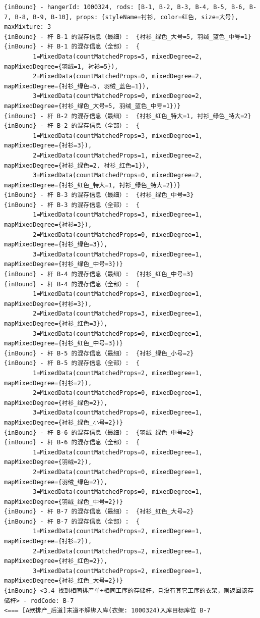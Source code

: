 {\begin{verbatim}
{inBound} - hangerId: 1000324, rods: [B-1, B-2, B-3, B-4, B-5, B-6, B-7, B-8, B-9, B-10], props: {styleName=衬衫, color=红色, size=大号}, maxMixture: 3
{inBound} - 杆 B-1 的混存信息（最细）:  {衬衫_绿色_大号=5, 羽绒_蓝色_中号=1}
{inBound} - 杆 B-1 的混存信息（全部）:  {
		1=MixedData(countMatchedProps=5, mixedDegree=2, mapMixedDegree={羽绒=1, 衬衫=5}), 
		2=MixedData(countMatchedProps=0, mixedDegree=2, mapMixedDegree={衬衫_绿色=5, 羽绒_蓝色=1}), 
		3=MixedData(countMatchedProps=0, mixedDegree=2, mapMixedDegree={衬衫_绿色_大号=5, 羽绒_蓝色_中号=1})}
{inBound} - 杆 B-2 的混存信息（最细）:  {衬衫_红色_特大=1, 衬衫_绿色_特大=2}
{inBound} - 杆 B-2 的混存信息（全部）:  {
		1=MixedData(countMatchedProps=3, mixedDegree=1, mapMixedDegree={衬衫=3}), 
		2=MixedData(countMatchedProps=1, mixedDegree=2, mapMixedDegree={衬衫_绿色=2, 衬衫_红色=1}), 
		3=MixedData(countMatchedProps=0, mixedDegree=2, mapMixedDegree={衬衫_红色_特大=1, 衬衫_绿色_特大=2})}
{inBound} - 杆 B-3 的混存信息（最细）:  {衬衫_绿色_中号=3}
{inBound} - 杆 B-3 的混存信息（全部）:  {
		1=MixedData(countMatchedProps=3, mixedDegree=1, mapMixedDegree={衬衫=3}), 
		2=MixedData(countMatchedProps=0, mixedDegree=1, mapMixedDegree={衬衫_绿色=3}), 
		3=MixedData(countMatchedProps=0, mixedDegree=1, mapMixedDegree={衬衫_绿色_中号=3})}
{inBound} - 杆 B-4 的混存信息（最细）:  {衬衫_红色_中号=3}
{inBound} - 杆 B-4 的混存信息（全部）:  {
		1=MixedData(countMatchedProps=3, mixedDegree=1, mapMixedDegree={衬衫=3}), 
		2=MixedData(countMatchedProps=3, mixedDegree=1, mapMixedDegree={衬衫_红色=3}), 
		3=MixedData(countMatchedProps=0, mixedDegree=1, mapMixedDegree={衬衫_红色_中号=3})}
{inBound} - 杆 B-5 的混存信息（最细）:  {衬衫_绿色_小号=2}
{inBound} - 杆 B-5 的混存信息（全部）:  {
		1=MixedData(countMatchedProps=2, mixedDegree=1, mapMixedDegree={衬衫=2}), 
		2=MixedData(countMatchedProps=0, mixedDegree=1, mapMixedDegree={衬衫_绿色=2}), 
		3=MixedData(countMatchedProps=0, mixedDegree=1, mapMixedDegree={衬衫_绿色_小号=2})}
{inBound} - 杆 B-6 的混存信息（最细）:  {羽绒_绿色_中号=2}
{inBound} - 杆 B-6 的混存信息（全部）:  {
		1=MixedData(countMatchedProps=0, mixedDegree=1, mapMixedDegree={羽绒=2}), 
		2=MixedData(countMatchedProps=0, mixedDegree=1, mapMixedDegree={羽绒_绿色=2}), 
		3=MixedData(countMatchedProps=0, mixedDegree=1, mapMixedDegree={羽绒_绿色_中号=2})}
{inBound} - 杆 B-7 的混存信息（最细）:  {衬衫_红色_大号=2}
{inBound} - 杆 B-7 的混存信息（全部）:  {
		1=MixedData(countMatchedProps=2, mixedDegree=1, mapMixedDegree={衬衫=2}), 
		2=MixedData(countMatchedProps=2, mixedDegree=1, mapMixedDegree={衬衫_红色=2}), 
		3=MixedData(countMatchedProps=2, mixedDegree=1, mapMixedDegree={衬衫_红色_大号=2})}
{inBound} <3.4 找到相同排产单+相同工序的存储杆，且没有其它工序的衣架，则返回该存储杆> - rodCode: B-7
<=== [A款排产_后道]末道不解绑入库(衣架: 1000324)入库目标库位 B-7


\end{verbatim}}
